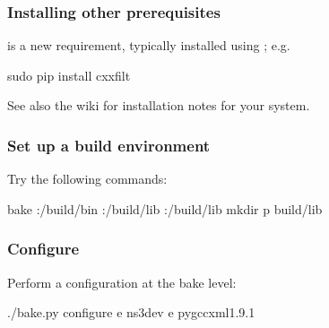 \documentclass[letterpaper,10pt,english]{sphinxmanual}
\renewcommand{\sphinxcode}[1]{\texttt{\small{#1}}}
\begin{document}
\subsubsection{Installing other prerequisites}
\label{\detokenize{python:installing-other-prerequisites}}
\sphinxcode{} is a new requirement, typically installed using \sphinxcode{}; e.g.

\begin{sphinxVerbatim}[commandchars=\\\{\}]
sudo pip install cxxfilt
\end{sphinxVerbatim}

See also the wiki for installation notes for your system.


\subsubsection{Set up a  build environment}
\label{\detokenize{python:set-up-a-bake-build-environment}}
Try the following commands:

\begin{sphinxVerbatim}[commandchars=\\\{\}]
\PYGZdl{}  bake
\PYGZdl{}  
\PYGZdl{}  :/build/bin
\PYGZdl{}  :/build/lib
\PYGZdl{}  :/build/lib
\PYGZdl{} mkdir \PYGZhy{}p build/lib
\end{sphinxVerbatim}


\subsubsection{Configure}
\label{\detokenize{python:configure}}
Perform a configuration at the bake level:

\begin{sphinxVerbatim}[commandchars=\\\{\}]
\PYGZdl{} ./bake.py configure \PYGZhy{}e ns\PYGZhy{}3\PYGZhy{}dev \PYGZhy{}e pygccxml\PYGZhy{}1.9.1
\end{sphinxVerbatim}
\end{document}
